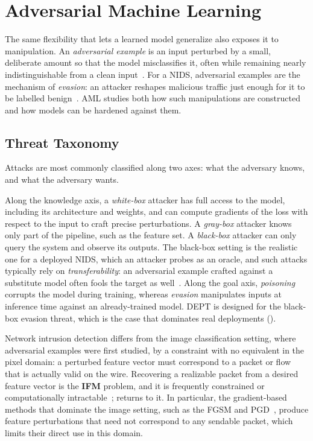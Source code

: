 \section{Adversarial Machine Learning}\label{sec:bg-aml}
The same flexibility that lets a learned model generalize also exposes it to manipulation.
An \emph{adversarial example} is an input perturbed by a small, deliberate amount so that
the model misclassifies it, often while remaining nearly indistinguishable from a clean
input~\cite{szegedy2014intriguing,goodfellow2014explaining}. For a \ac{NIDS}, adversarial
examples are the mechanism of \emph{evasion}: an attacker reshapes malicious traffic just
enough for it to be labelled benign~\cite{he2023adversarial,ennaji2025adversarial}.
\ac{AML} studies both how such manipulations are constructed and how models can be hardened
against them.

\subsection{Threat Taxonomy}\label{subsec:bg-threat-taxonomy}
Attacks are most commonly classified along two axes: what the adversary knows, and what the adversary
wants.

Along the knowledge axis, a \emph{white-box} attacker has full access to the model,
including its architecture and weights, and can compute gradients of the loss with respect
to the input to craft precise perturbations. A \emph{gray-box} attacker knows only part of
the pipeline, such as the feature set. A \emph{black-box} attacker can only query the
system and observe its outputs. The black-box setting is the realistic one for a deployed
\ac{NIDS}, which an attacker probes as an oracle, and such attacks typically rely on
\emph{transferability}: an adversarial example crafted against a substitute model often
fools the target as well~\cite{papernot2017practical}. Along the goal axis, \emph{poisoning}
corrupts the model during training, whereas \emph{evasion} manipulates inputs at inference
time against an already-trained model. DEPT is designed for the black-box evasion threat,
which is the case that dominates real deployments ().

Network intrusion detection differs from the image classification setting, where
adversarial examples were first studied, by a constraint with no equivalent in the pixel
domain: a perturbed feature vector must correspond to a packet or flow that is actually
valid on the wire. Recovering a realizable packet from a desired feature vector is the
\textbf{\ac{IFM}} problem, and it is frequently constrained or computationally
intractable~\cite{pierazzi2020intriguing,hashemi2019towards,sun2023gpmt};
 returns to it. In particular, the gradient-based methods
that dominate the image setting, such as the \ac{FGSM} and
\ac{PGD}~\cite{goodfellow2014explaining,madry2018towards}, produce feature perturbations
that need not correspond to any sendable packet, which limits their direct use in this
domain.

